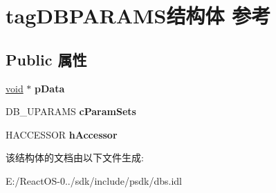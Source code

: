 \hypertarget{structtag_d_b_p_a_r_a_m_s}{}\section{tag\+D\+B\+P\+A\+R\+A\+M\+S结构体 参考}
\label{structtag_d_b_p_a_r_a_m_s}
\subsection*{Public 属性}
\begin{DoxyCompactItemize}
\item 
\mbox{\label{structtag_d_b_p_a_r_a_m_s_ae126aa5e920ef8892810a2930bf79df0}} 
\hyperlink{interfacevoid}{void} $\ast$ {\bfseries p\+Data}
\item 
\mbox{\label{structtag_d_b_p_a_r_a_m_s_a05104819cb4f33c9c8b57cdce57a32a8}} 
D\+B\+\_\+\+U\+P\+A\+R\+A\+MS {\bfseries c\+Param\+Sets}
\item 
\mbox{\label{structtag_d_b_p_a_r_a_m_s_ac7b56ac252d8af1d0eb7da584fa0922d}} 
H\+A\+C\+C\+E\+S\+S\+OR {\bfseries h\+Accessor}
\end{DoxyCompactItemize}


该结构体的文档由以下文件生成\+:\begin{DoxyCompactItemize}
\item 
E\+:/\+React\+O\+S-\/0../sdk/include/psdk/dbs.\+idl\end{DoxyCompactItemize}
